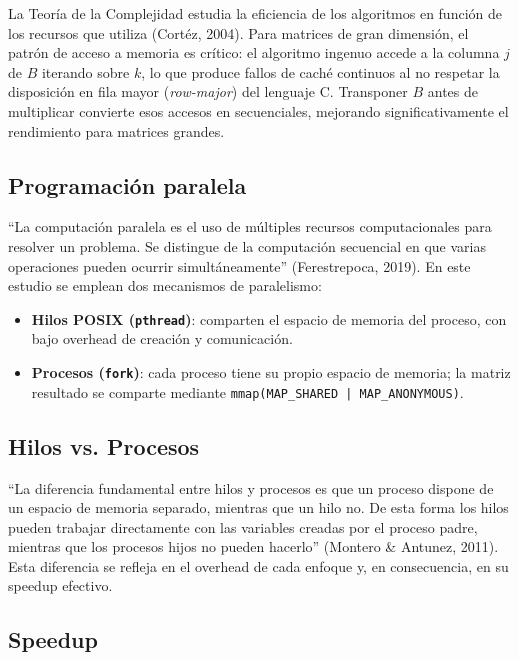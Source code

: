 \documentclass{article}
\begin{document}
La Teoría de la Complejidad estudia la eficiencia de los algoritmos en función de los recursos que utiliza (Cortéz, 2004). Para matrices de gran dimensión, el patrón de acceso a memoria es crítico: el algoritmo ingenuo accede a la columna $j$ de $B$ iterando sobre $k$, lo que produce fallos de caché continuos al no respetar la disposición en fila mayor (\emph{row-major}) del lenguaje C. Transponer $B$ antes de multiplicar convierte esos accesos en secuenciales, mejorando significativamente el rendimiento para matrices grandes.

\subsection{Programación paralela}

``La computación paralela es el uso de múltiples recursos computacionales para resolver un problema. Se distingue de la computación secuencial en que varias operaciones pueden ocurrir simultáneamente'' (Ferestrepoca, 2019). En este estudio se emplean dos mecanismos de paralelismo:

\begin{itemize}
    \item \textbf{Hilos POSIX (\texttt{pthread})}: comparten el espacio de memoria del proceso, con bajo overhead de creación y comunicación.
    \item \textbf{Procesos (\texttt{fork})}: cada proceso tiene su propio espacio de memoria; la matriz resultado se comparte mediante \texttt{mmap(MAP\_SHARED | MAP\_ANONYMOUS)}.
\end{itemize}

\subsection{Hilos vs. Procesos}

``La diferencia fundamental entre hilos y procesos es que un proceso dispone de un espacio de memoria separado, mientras que un hilo no. De esta forma los hilos pueden trabajar directamente con las variables creadas por el proceso padre, mientras que los procesos hijos no pueden hacerlo'' (Montero \& Antunez, 2011). Esta diferencia se refleja en el overhead de cada enfoque y, en consecuencia, en su speedup efectivo.

\subsection{Speedup}
\end{document}
